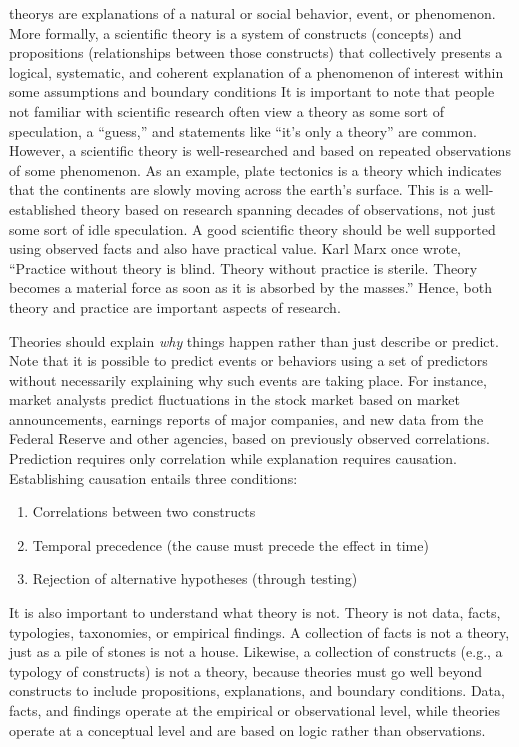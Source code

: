 \Glspl{theory} are explanations of a natural or social behavior, event, or phenomenon. More formally, a scientific theory is a system of constructs (concepts) and propositions (relationships between those constructs) that collectively presents a logical, systematic, and coherent explanation of a phenomenon of interest within some assumptions and boundary conditions\cite{bacharach1989organizational} It is important to note that people not familiar with scientific research often view a theory as some sort of speculation, a ``guess,'' and statements like ``it's only a theory'' are common. However, a scientific theory is well-researched and based on repeated observations of some phenomenon. As an example, plate tectonics is a theory which indicates that the continents are slowly moving across the earth's surface. This is a well-established theory based on research spanning decades of observations, not just some sort of idle speculation. A good scientific theory should be well supported using observed facts and also have practical value. Karl Marx once wrote, ``Practice without theory is blind. Theory without practice is sterile. Theory becomes a material force as soon as it is absorbed by the masses.''\cite{marx1971contribution} Hence, both theory and practice are important aspects of research.

Theories should explain \textit{why} things happen rather than just describe or predict. Note that it is possible to predict events or behaviors using a set of predictors without necessarily explaining why such events are taking place. For instance, market analysts predict fluctuations in the stock market based on market announcements, earnings reports of major companies, and new data from the Federal Reserve and other agencies, based on previously observed correlations. Prediction requires only correlation while explanation requires causation. Establishing causation entails three conditions: 

\begin{enumerate}
	\item Correlations between two constructs
	\item Temporal precedence (the cause must precede the effect in time)
	\item Rejection of alternative hypotheses (through testing)
\end{enumerate}

It is also important to understand what theory is not. Theory is not data, facts, typologies, taxonomies, or empirical findings. A collection of facts is not a theory, just as a pile of stones is not a house. Likewise, a collection of constructs (e.g., a typology of constructs) is not a theory, because theories must go well beyond constructs to include propositions, explanations, and boundary conditions. Data, facts, and findings operate at the empirical or observational level, while theories operate at a conceptual level and are based on logic rather than observations.

